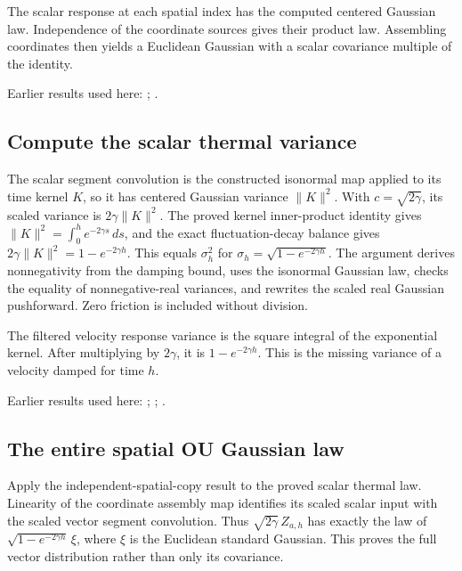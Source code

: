 \documentclass[11pt,a4paper]{report}
\begin{document}
The scalar response at each spatial index has the computed centered Gaussian law. Independence of the coordinate sources gives their product law. Assembling coordinates then yields a Euclidean Gaussian with a scalar covariance multiple of the identity.



Earlier results used here: \cite[Section~3.8.16]{LangevinLean2026ULASC}; \cite[Section~3.8.17]{LangevinLean2026ULASC}.
\subsection{\texorpdfstring{Compute the scalar thermal variance}{Compute the scalar thermal variance}}
\label{report-step-KineticLangevin-OUMarginal-lean-2}


The scalar segment convolution is the constructed isonormal map applied to its time kernel \(K\), so it has centered Gaussian variance \(\|K\|^2\). With \(c=\sqrt{2\gamma}\), its scaled variance is \(2\gamma\|K\|^2\). The proved kernel inner-product identity gives \(\|K\|^2=\int_0^h e^{-2\gamma s}\,ds\), and the exact fluctuation-decay balance gives \(2\gamma\|K\|^2=1-e^{-2\gamma h}\). This equals \(\sigma_h^2\) for \(\sigma_h=\sqrt{1-e^{-2\gamma h}}\). The argument derives nonnegativity from the damping bound, uses the isonormal Gaussian law, checks the equality of nonnegative-real variances, and rewrites the scaled real Gaussian pushforward. Zero friction is included without division.



The filtered velocity response variance is the square integral of the exponential kernel. After multiplying by \(2\gamma\), it is \(1-e^{-2\gamma h}\). This is the missing variance of a velocity damped for time \(h\).



Earlier results used here: \cite[Section~3.6.12]{LangevinLean2026ULASC}; \cite[Section~3.6.24]{LangevinLean2026ULASC}; \cite[Section~3.8.5]{LangevinLean2026ULASC}.
\subsection{\texorpdfstring{The entire spatial OU Gaussian law}{The entire spatial OU Gaussian law}}
\label{report-step-KineticLangevin-OUMarginal-lean-3}


Apply the independent-spatial-copy result to the proved scalar thermal law. Linearity of the coordinate assembly map identifies its scaled scalar input with the scaled vector segment convolution. Thus \(\sqrt{2\gamma}\,Z_{a,h}\) has exactly the law of \(\sqrt{1-e^{-2\gamma h}}\,\xi\), where \(\xi\) is the Euclidean standard Gaussian. This proves the full vector distribution rather than only its covariance.
\end{document}
